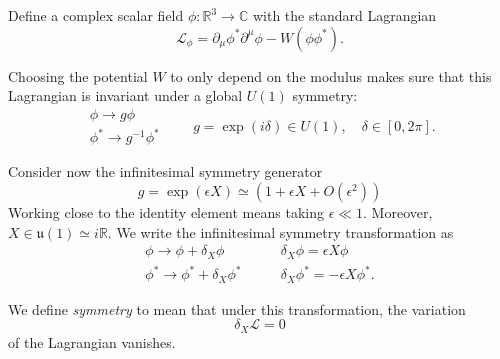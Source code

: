 Define a complex scalar field $\phi \colon \mathbb{R}^3 \to \mathbb{C}$ with the standard Lagrangian
\begin{equation}
  \mathcal{L}_\phi = \partial_{\mu} \phi^* \partial^{\mu} \phi - W(\phi \phi^*).
\end{equation}

Choosing the potential $W$ to only depend on the modulus makes sure that this Lagrangian is invariant under a global $U(1)$ symmetry:
\begin{equation}
  \begin{gathered}
    \phi \to g\phi \\
    \phi^* \to g^{-1} \phi^*
  \end{gathered}
  \qquad g = \exp(i \delta) \in U(1), \quad \delta \in [0, 2\pi].
\end{equation}

Consider now the infinitesimal symmetry generator
\begin{equation}
  g = \exp(\epsilon X) \simeq (1 + \epsilon X + O(\epsilon^2))
\end{equation}
Working close to the identity element means taking $\epsilon \ll 1$. Moreover, $X \in \mathfrak{u}(1) \simeq i \mathbb{R}$.
We write the infinitesimal symmetry transformation as 
\begin{equation}
  \begin{gathered}
    \phi \to \phi + \delta_X \phi \\
    \phi^* \to \phi^* + \delta_X \phi^*
  \end{gathered}
  \qquad
  \begin{gathered}
    \delta_X \phi = \epsilon X \phi \\
    \delta_X \phi^* = -\epsilon X \phi^*.
  \end{gathered}
\end{equation}

We define \emph{symmetry} to mean that  under this transformation, the variation 
\begin{equation}
  \label{eq:symmetry}
  \boxed{\delta_X \mathcal{L} = 0} 
\end{equation}
of the Lagrangian vanishes. 
